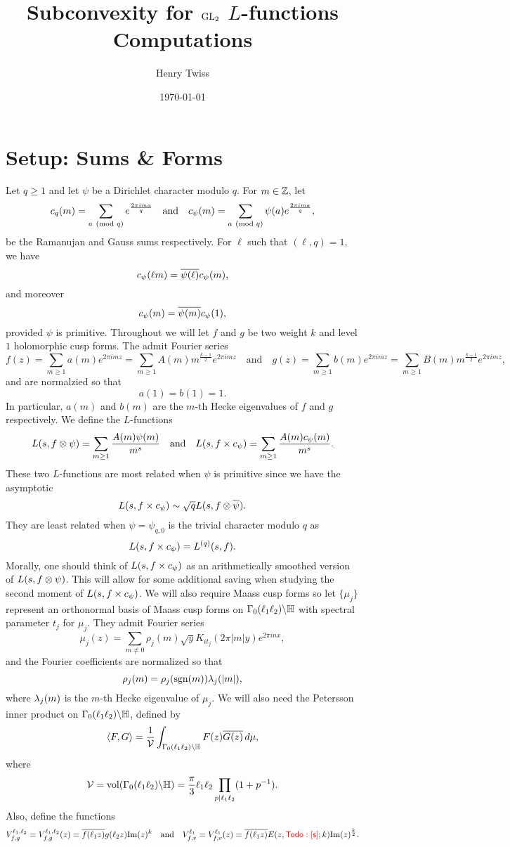\documentclass[12pt,reqno,oneside]{amsart}
\title{Subconvexity for $\mathrm{GL}_{2}$ $L$-functions Computations}
\author{Henry Twiss}
\date{\today}
\begin{document}
\maketitle

\section{Setup: Sums \& Forms}
  Let $q \ge 1$ and let $\psi$ be a Dirichlet character modulo $q$. For $m \in \mathbb{Z}$, let
  \[
    c_{q}(m) = \sum_{a \ \left(\text{mod }q\right)}e^{\frac{2\pi ima}{q}} \quad \text{and} \quad c_{\psi}(m) = \sum_{a \ \left(\text{mod }q\right)}\psi(a)e^{\frac{2\pi ima}{q}},
  \]
  be the Ramanujan and Gauss sums respectively. For $\ell$ such that $(\ell,q) = 1$, we have
  \[
    c_{\psi}(\ell m) = \overline{\psi(\ell)}c_{\psi}(m),
  \]
  and moreover
  \[
    c_{\psi}(m) = \overline{\psi(m)}c_{\psi}(1),
  \]
  provided $\psi$ is primitive. Throughout we will let $f$ and $g$ be two weight $k$ and level $1$ holomorphic cusp forms. The admit Fourier series
  \[
    f(z) = \sum_{m \ge 1}a(m)e^{2\pi imz} = \sum_{m \ge 1}A(m)m^{\frac{k-1}{2}}e^{2\pi imz} \quad \text{and} \quad g(z) = \sum_{m \ge 1}b(m)e^{2\pi imz} = \sum_{m \ge 1}B(m)m^{\frac{k-1}{2}}e^{2\pi imz},
  \]
  and are normalzied so that
  \[
    a(1) = b(1) = 1.
  \]
  In particular, $a(m)$ and $b(m)$ are the $m$-th Hecke eigenvalues of $f$ and $g$ respectively. We define the $L$-functions
  \[
    L(s,f \otimes \psi) = \sum_{m \ge 1}\frac{A(m)\psi(m)}{m^{s}} \quad \text{and} \quad L(s,f \times c_{\psi}) = \sum_{m \ge 1}\frac{A(m)c_{\psi}(m)}{m^{s}}.
  \]
  These two $L$-functions are most related when $\psi$ is primitive since we have the asymptotic
  \[
    L(s,f \times c_{\psi}) \sim \sqrt{q}L(s,f \otimes \overline{\psi}).
  \]
  They are least related when $\psi = \psi_{q,0}$ is the trivial character modulo $q$ as
  \[
    L(s,f \times c_{\psi}) = L^{(q)}(s,f).
  \]
  Morally, one should think of $L(s,f \times c_{\psi})$ as an arithmetically smoothed version of $L(s,f \otimes \psi)$. This will allow for some additional saving when studying the second moment of $L(s,f \times c_{\psi})$. We will also require Maass cusp forms so let $\{\mu_{j}\}$ represent an orthonormal basis of Maass cusp forms on $\Gamma_{0}(\ell_{1}\ell_{2})\backslash\mathbb{H}$ with spectral parameter $t_{j}$ for $\mu_{j}$. They admit Fourier series
  \[
    \mu_{j}(z) = \sum_{m \neq 0}\rho_{j}(m)\sqrt{y}K_{it_{j}}(2\pi|m|y)e^{2\pi inx},
  \]
  and the Fourier coefficients are normalized so that
  \[
    \rho_{j}(m) = \rho_{j}(\operatorname{\mathrm{sgn}}(m))\lambda_{j}(|m|),
  \]
  where $\lambda_{j}(m)$ is the $m$-th Hecke eigenvalue of $\mu_{j}$. We will also need the Petersson inner product on $\Gamma_{0}(\ell_{1}\ell_{2})\backslash\mathbb{H}$, defined by
  \[
    \langle F,G\rangle = \frac{1}{\mathcal{V}}\int_{\Gamma_{0}(\ell_{1}\ell_{2})\backslash\mathbb{H}}F(z)\overline{G(z)}\,d\mu,
  \]
  where
  \[
    \mathcal{V} = \mathrm{vol}(\Gamma_{0}(\ell_{1}\ell_{2})\backslash\mathbb{H}) = \frac{\pi}{3}\ell_{1}\ell_{2}\prod_{p \mid \ell_{1}\ell_{2}}(1+p^{-1}).
  \]
  Also, define the functions
  \[
    V_{f,g}^{\ell_{1},\ell_{2}} = V_{f,g}^{\ell_{1},\ell_{2}}(z) = \overline{f(\ell_{1}z)}g(\ell_{2}z)\mathrm{Im}(z)^{k} \quad \text{and} \quad V_{f,v}^{\ell_{1}} = V_{f,v}^{\ell_{1}}(z) = \overline{f(\ell_{1}z)}E(z,\textcolor{red}{\sf Todo: [s]};k)\mathrm{Im}(z)^{\frac{k}{2}}.
  \]
\end{document}
